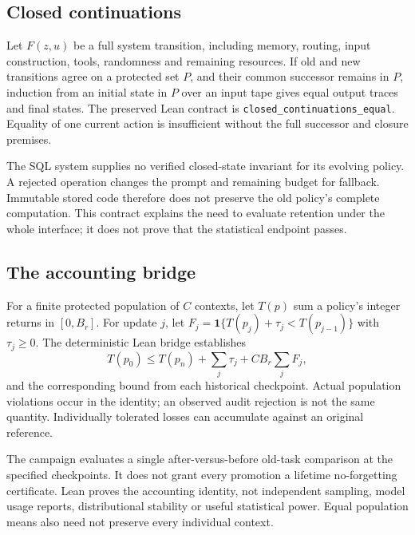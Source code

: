 \documentclass[10pt,twocolumn]{article}
\newcommand{\code}[1]{\texttt{\small #1}}
\begin{document}
\subsection{Closed continuations}
Let $F(z,u)$ be a full system transition, including memory, routing, input
construction, tools, randomness and remaining resources. If old and new
transitions agree on a protected set $P$, and their common successor remains in
$P$, induction from an initial state in $P$ over an input tape gives equal output
traces and final states.
The preserved Lean contract is \code{closed\_continuations\_equal}. Equality of
one current action is insufficient without the full successor and closure
premises.

The SQL system supplies no verified closed-state invariant for its evolving
policy. A rejected operation changes the prompt and remaining budget for
fallback. Immutable stored code therefore does not preserve the old policy's
complete computation. This contract explains the need to evaluate retention
under the whole interface; it does not prove that the statistical endpoint
passes.

\subsection{The accounting bridge}
For a finite protected population of $C$ contexts, let $T(p)$ sum a policy's
integer returns in $[0,B_r]$. For update $j$, let
$F_j=\mathbf1\{T(p_j)+\tau_j<T(p_{j-1})\}$ with $\tau_j\ge0$. The deterministic
Lean bridge establishes
\begin{equation}\label{eq:promotion}
T(p_0)\le T(p_n)+\sum_j\tau_j+CB_r\sum_jF_j,
\end{equation}
and the corresponding bound from each historical checkpoint. Actual population
violations occur in the identity; an observed audit rejection is not the same
quantity. Individually tolerated losses can accumulate against an original
reference.

The campaign evaluates a single after-versus-before old-task comparison at the
specified checkpoints. It does not grant every promotion a lifetime
no-forgetting certificate. Lean proves the accounting identity, not independent
sampling, model usage reports, distributional stability or useful statistical
power. Equal population means also need not preserve every individual context.
\end{document}
